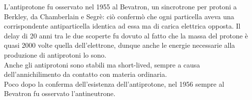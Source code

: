L'antiprotone fu osservato nel 1955 al Bevatron, un sincrotrone per protoni a Berkley, da Chamberlain e Segrè: ciò confermò che ogni particella aveva una corrispondente antiparticella identica ad essa ma di carica elettrica opposta. Il delay di 20 anni tra le due scoperte fu dovuto al fatto che la massa del protone è quasi 2000 volte quella dell'elettrone, dunque anche le energie necessarie alla produzione di antiprotoni lo sono.\\
Anche gli antiprotoni sono stabili ma short-lived, sempre a causa dell'annichilimento da contatto con materia ordinaria.\\
Poco dopo la conferma dell'esistenza dell'antiprotone, nel 1956 sempre al Bevatron fu osservato l'antineutrone.










